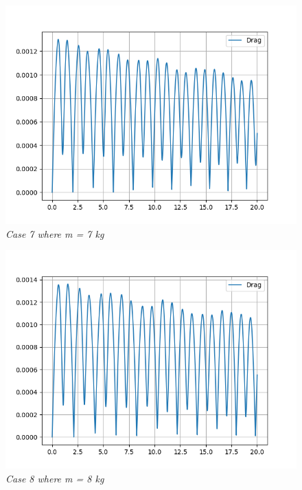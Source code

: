     \begin{figure}[H]
        \centering
        \includegraphics{Appendix/Derived Data Pictures/dm7.png}
        \caption{\textit{Case 7 where m = 7 kg}}
        \label{}
    \end{figure}
            
    \begin{figure}[H]
        \centering
        \includegraphics{Appendix/Derived Data Pictures/dm8.png}
        \caption{\textit{Case 8 where m = 8 kg}}
        \label{}
    \end{figure}
            
